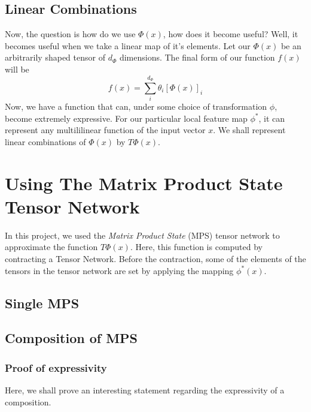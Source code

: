 \documentclass[11pt]{article}
\theoremstyle{definition}
\theoremstyle{definition}
\begin{document}
\subsection{Linear Combinations}
Now, the question is how do we use $\Phi(x)$, how does it become useful? 
Well, it becomes useful when we take a linear map of it's elements. Let our $\Phi(x)$ be an 
arbitrarily shaped tensor of $d_{\Phi}$ dimensions. The final form of our 
function $f(x)$ will be
\begin{equation}
    f(x) = \sum_{i}^{d_{\Phi}} \theta_i [\Phi(x)]_i
\end{equation}
Now, we have a function that can, under some choice of transformation
$\phi$, become extremely expressive. For our particular local feature map 
$\phi^*$, it can represent any multililinear function  of the input vector $x$. 
We shall represent linear combinations of $\Phi(x)$ by $T\Phi(x)$.

\section{Using The Matrix Product State Tensor Network}
In this project, we used the {\it Matrix Product State} (MPS) tensor network to 
approximate the function $T  \Phi(x)$. Here, this function is computed by contracting 
a Tensor Network. Before the contraction, some of the elements of the tensors in the 
tensor network are set by applying the mapping $\phi^*(x)$.

\subsection{Single MPS}


\subsection{Composition of MPS}

\subsubsection{Proof of expressivity}
Here, we shall prove an interesting statement regarding the expressivity 
of a composition. 
\end{document}
